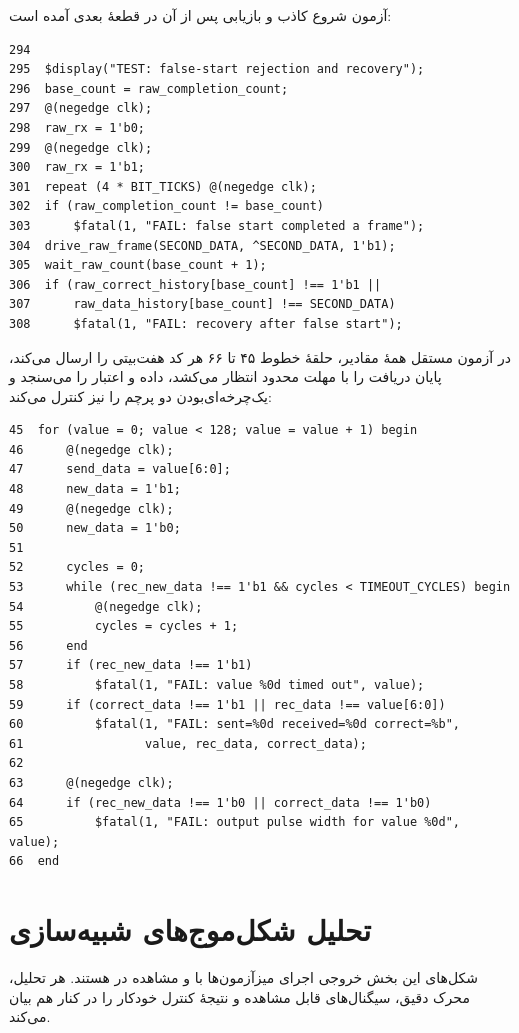 آزمون شروع کاذب و بازیابی پس از آن در قطعهٔ بعدی آمده است:

\begin{dsdlcodeblock}
\begin{verbatim}
294
295  $display("TEST: false-start rejection and recovery");
296  base_count = raw_completion_count;
297  @(negedge clk);
298  raw_rx = 1'b0;
299  @(negedge clk);
300  raw_rx = 1'b1;
301  repeat (4 * BIT_TICKS) @(negedge clk);
302  if (raw_completion_count != base_count)
303      $fatal(1, "FAIL: false start completed a frame");
304  drive_raw_frame(SECOND_DATA, ^SECOND_DATA, 1'b1);
305  wait_raw_count(base_count + 1);
306  if (raw_correct_history[base_count] !== 1'b1 ||
307      raw_data_history[base_count] !== SECOND_DATA)
308      $fatal(1, "FAIL: recovery after false start");
\end{verbatim}
\end{dsdlcodeblock}

در آزمون مستقل همهٔ مقادیر، حلقهٔ خطوط ۴۵ تا ۶۶ هر کد هفت‌بیتی را ارسال می‌کند، پایان
دریافت را با مهلت محدود انتظار می‌کشد، داده و اعتبار را می‌سنجد و یک‌چرخه‌ای‌بودن دو پرچم
را نیز کنترل می‌کند:

\begin{dsdlcodeblock}
\begin{verbatim}
45  for (value = 0; value < 128; value = value + 1) begin
46      @(negedge clk);
47      send_data = value[6:0];
48      new_data = 1'b1;
49      @(negedge clk);
50      new_data = 1'b0;
51
52      cycles = 0;
53      while (rec_new_data !== 1'b1 && cycles < TIMEOUT_CYCLES) begin
54          @(negedge clk);
55          cycles = cycles + 1;
56      end
57      if (rec_new_data !== 1'b1)
58          $fatal(1, "FAIL: value %0d timed out", value);
59      if (correct_data !== 1'b1 || rec_data !== value[6:0])
60          $fatal(1, "FAIL: sent=%0d received=%0d correct=%b",
61                 value, rec_data, correct_data);
62
63      @(negedge clk);
64      if (rec_new_data !== 1'b0 || correct_data !== 1'b0)
65          $fatal(1, "FAIL: output pulse width for value %0d", value);
66  end
\end{verbatim}
\end{dsdlcodeblock}


\section{تحلیل شکل‌موج‌های شبیه‌سازی}

شکل‌های این بخش خروجی اجرای میزآزمون‌ها با  و مشاهده در
 هستند. هر تحلیل، محرک دقیق، سیگنال‌های قابل مشاهده و نتیجهٔ کنترل خودکار را
در کنار هم بیان می‌کند.


